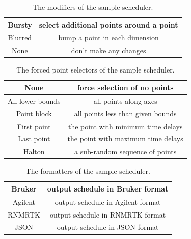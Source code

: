 \begin{table}[h]
  \begin{tabular}{ | c | c | }
    \hline
    Bursty    &  select additional points around a point  \\  \hline
    Blurred   &  bump a point in each dimension   \\  \hline
    None      &  don't make any changes           \\  \hline
  \end{tabular}
  \caption{The modifiers of the sample scheduler.}
  \label{scheduler_modifiers}
\end{table}

\begin{table}[h]
  \begin{tabular}{ | c | c | }
    \hline
    None                &  force selection of no points         \\  \hline
    All lower bounds    &  all points along axes                \\  \hline
    Point block         &  all points less than given bounds    \\  \hline
    First point         &  the point with minimum time delays   \\  \hline
    Last point          &  the point with maximum time delays   \\  \hline
    Halton              &  a sub-random sequence of points      \\  \hline
  \end{tabular}
  \caption{The forced point selectors of the sample scheduler.}
  \label{scheduler_forced_point_selectors}
\end{table}

\begin{table}[h]
  \begin{tabular}{ | c | c | }
    \hline
    Bruker      &  output schedule in Bruker format   \\  \hline
    Agilent     &  output schedule in Agilent format  \\  \hline
    RNMRTK      &  output schedule in RNMRTK format   \\  \hline
    JSON        &  output schedule in JSON format     \\  \hline
  \end{tabular}
  \caption{The formatters of the sample scheduler.}
  \label{scheduler_formatters}
\end{table}



\clearpage
